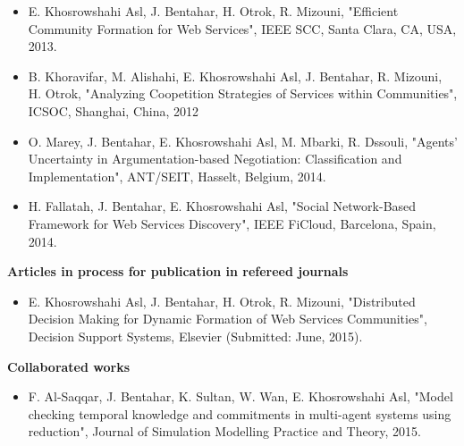 \begin{itemize}
\item E. Khosrowshahi Asl, J. Bentahar, H. Otrok, R. Mizouni, "Efficient Community Formation for Web Services", IEEE SCC, Santa Clara, CA, USA, 2013.

\item B. Khoravifar, M. Alishahi, E. Khosrowshahi Asl, J. Bentahar, R. Mizouni, H. Otrok, "Analyzing Coopetition Strategies of Services within Communities", ICSOC, Shanghai, China, 2012

\item O. Marey, J. Bentahar, E. Khosrowshahi Asl, M. Mbarki, R. Dssouli, "Agents' Uncertainty in Argumentation-based Negotiation: Classification and Implementation", ANT/SEIT, Hasselt, Belgium, 2014.

\item H. Fallatah, J. Bentahar, E. Khosrowshahi Asl, "Social Network-Based Framework for Web Services Discovery", IEEE  FiCloud, Barcelona, Spain, 2014.


\end{itemize}

\textbf{Articles in process for publication in refereed journals}

\begin{itemize}
\item E. Khosrowshahi Asl, J. Bentahar, H. Otrok, R. Mizouni, "Distributed Decision Making for Dynamic Formation of Web Services Communities", Decision Support Systems, Elsevier (Submitted: June, 2015).
\end{itemize}

\textbf{Collaborated works}

\begin{itemize}
\item F. Al-Saqqar, J. Bentahar, K. Sultan, W. Wan, E. Khosrowshahi Asl, "Model checking temporal knowledge and commitments in multi-agent systems using reduction", Journal of Simulation Modelling Practice and Theory, 2015.
\end{itemize}

